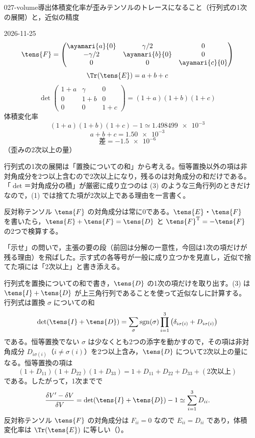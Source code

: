 \documentclass[uplatex,dvipdfmx,a4paper,11pt]{jsarticle}
\begin{document}
\begin{mondai}{027-volume}{導出}{体積変化率が歪みテンソルのトレースになること（行列式の1次の展開）と，近似の精度}
\begin{kotaeutsushi}{2026-11-25}
\[ \tens{F}=\begin{pmatrix}\ayamari{a}{0}&\gamma/2&0\\-\gamma/2&\ayamari{b}{0}&0\\0&0&\ayamari{c}{0}\end{pmatrix} \]
\[ \Tr(\tens{E})=a+b+c \]
\[ \det\begin{pmatrix}1+a&\gamma&0\\0&1+b&0\\0&0&1+c\end{pmatrix}=(1+a)(1+b)(1+c) \]
体積変化率
\[ (1+a)(1+b)(1+c)-1\simeq\num{1.498499e-3} \]
\[ a+b+c=\num{1.50e-3} \]
\[ \text{差}=\num{-1.5e-6} \]
（歪みの2次以上の量）
\end{kotaeutsushi}
\begin{kizuki}
\item 行列式の1次の展開は「置換についての和」から考える。恒等置換以外の項は非対角成分を2つ以上含むので2次以上になり，残るのは対角成分の和だけである。「$\det$＝対角成分の積」が厳密に成り立つのは (3) のような三角行列のときだけなので，(1) では捨てた項が2次以上である理由を一言書く。
\item 反対称テンソル $\tens{F}$ の対角成分は常に0である。$\tens{E}$・$\tens{F}$ を書いたら，$\tens{E}+\tens{F}=\tens{D}$ と $\tens{F}^{\mathrm{T}}=-\tens{F}$ の2つで検算する。
\item {} 「示せ」の問いで，主張の要の段（前回は分解の一意性，今回は1次の項だけが残る理由）を飛ばした。示す式の各等号が一般に成り立つかを見直し，近似で捨てた項には「2次以上」と書き添える。
\end{kizuki}
\begin{tadashii}
\houshin 行列式を置換についての和で書き，$\tens{D}$ の1次の項だけを取り出す。(3) は $\tens{I}+\tens{D}$ が上三角行列であることを使って近似なしに計算する。
\keisan {} 行列式は置換 $\sigma$ についての和
\[ \det(\tens{I}+\tens{D})=\sum_{\sigma}\operatorname{sgn}(\sigma)\prod_{i=1}^{3}\left(\delta_{i\sigma(i)}+D_{i\sigma(i)}\right) \]
である。恒等置換でない $\sigma$ は少なくとも2つの添字を動かすので，その項は非対角成分 $D_{i\sigma(i)}$（$i\neq\sigma(i)$）を2つ以上含み，$\tens{D}$ について2次以上の量になる。恒等置換の項は
\[ (1+D_{11})(1+D_{22})(1+D_{33})=1+D_{11}+D_{22}+D_{33}+(\text{2次以上}) \]
である。したがって，1次までで
\[ \frac{\delta V'-\delta V}{\delta V}=\det(\tens{I}+\tens{D})-1\simeq\sum_{i=1}^{3}D_{ii}. \]
反対称テンソル $\tens{F}$ の対角成分は $F_{ii}=0$ なので $E_{ii}=D_{ii}$ であり，体積変化率は $\Tr(\tens{E})$ に等しい（）。


\end{tadashii}
\end{mondai}
\end{document}
